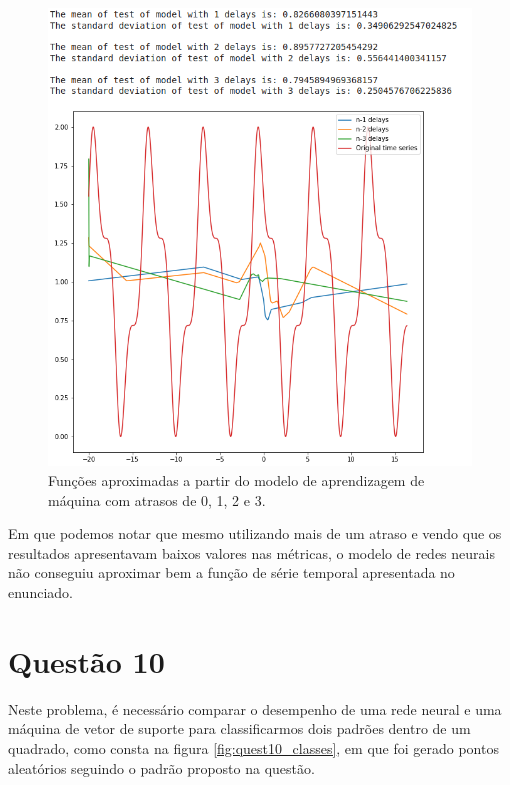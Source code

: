 \documentclass[a4paper, 12pt]{article}
\begin{document}
\begin{figure}[h]
	\centering
	\includegraphics[width=0.8\linewidth]{figuras/quest9_saida}
    \caption{Funções aproximadas a partir do modelo de aprendizagem de máquina com atrasos de 0, 1, 2 e 3.}
    \label{fig:quest9_saida}
\end{figure}
\FloatBarrier
Em que podemos notar que mesmo utilizando mais de um atraso e vendo que os resultados apresentavam baixos valores nas métricas, o modelo de redes neurais não conseguiu aproximar bem a função de série temporal apresentada no enunciado.



\section{Questão 10}

Neste problema, é necessário comparar o desempenho de uma rede neural e uma máquina de vetor de suporte para classificarmos dois padrões dentro de um quadrado, como consta na figura \ref{fig:quest10_classes}, em que foi gerado pontos aleatórios seguindo o padrão proposto na questão.
\end{document}
